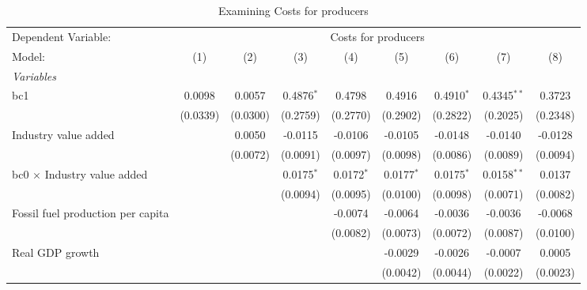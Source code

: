 
\begin{table}[htbp]
   \caption{Examining Costs for producers}
   \centering
   \begin{tabular}{lcccccccc}
      \tabularnewline \midrule \midrule
      Dependent Variable: & \multicolumn{8}{c}{Costs for producers}\\
      Model:                                  & (1)      & (2)      & (3)          & (4)          & (5)          & (6)          & (7)           & (8)\\  
      \midrule
      \emph{Variables}\\
      bc1                                     & 0.0098   & 0.0057   & 0.4876$^{*}$ & 0.4798       & 0.4916       & 0.4910$^{*}$ & 0.4345$^{**}$ & 0.3723\\   
                                              & (0.0339) & (0.0300) & (0.2759)     & (0.2770)     & (0.2902)     & (0.2822)     & (0.2025)      & (0.2348)\\   
      Industry value added                    &          & 0.0050   & -0.0115      & -0.0106      & -0.0105      & -0.0148      & -0.0140       & -0.0128\\   
                                              &          & (0.0072) & (0.0091)     & (0.0097)     & (0.0098)     & (0.0086)     & (0.0089)      & (0.0094)\\   
      bc0 $\times$ Industry value added       &          &          & 0.0175$^{*}$ & 0.0172$^{*}$ & 0.0177$^{*}$ & 0.0175$^{*}$ & 0.0158$^{**}$ & 0.0137\\   
                                              &          &          & (0.0094)     & (0.0095)     & (0.0100)     & (0.0098)     & (0.0071)      & (0.0082)\\   
      Fossil fuel production per capita       &          &          &              & -0.0074      & -0.0064      & -0.0036      & -0.0036       & -0.0068\\   
                                              &          &          &              & (0.0082)     & (0.0073)     & (0.0072)     & (0.0087)      & (0.0100)\\   
      Real GDP growth                         &          &          &              &              & -0.0029      & -0.0026      & -0.0007       & 0.0005\\   
                                              &          &          &              &              & (0.0042)     & (0.0044)     & (0.0022)      & (0.0023)\\   

\end{tabular}
\end{table}
